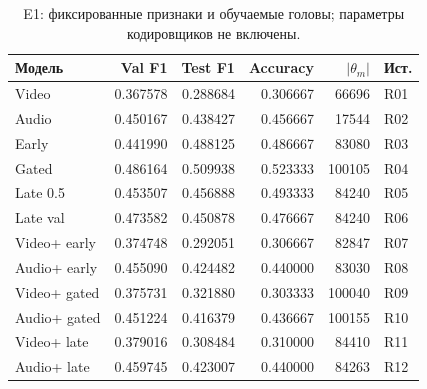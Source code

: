 \begin{table}[H]\centering\footnotesize
\setlength{\tabcolsep}{4pt}
\caption{E1: фиксированные признаки и обучаемые головы; параметры кодировщиков не включены.}\label{tab:models}
\begin{tabular}{lrrrrl}
\toprule
Модель & Val F1 & Test F1 & Accuracy & $|\theta_m|$ & Ист. \\
\midrule
Video & 0.367578 & 0.288684 & 0.306667 & 66696 & R01 \\
Audio & 0.450167 & 0.438427 & 0.456667 & 17544 & R02 \\
Early & 0.441990 & 0.488125 & 0.486667 & 83080 & R03 \\
Gated & 0.486164 & 0.509938 & 0.523333 & 100105 & R04 \\
Late 0.5 & 0.453507 & 0.456888 & 0.493333 & 84240 & R05 \\
Late val & 0.473582 & 0.450878 & 0.476667 & 84240 & R06 \\
Video+ early & 0.374748 & 0.292051 & 0.306667 & 82847 & R07 \\
Audio+ early & 0.455090 & 0.424482 & 0.440000 & 83030 & R08 \\
Video+ gated & 0.375731 & 0.321880 & 0.303333 & 100040 & R09 \\
Audio+ gated & 0.451224 & 0.416379 & 0.436667 & 100155 & R10 \\
Video+ late & 0.379016 & 0.308484 & 0.310000 & 84410 & R11 \\
Audio+ late & 0.459745 & 0.423007 & 0.440000 & 84263 & R12 \\
\bottomrule
\end{tabular}
\end{table}
